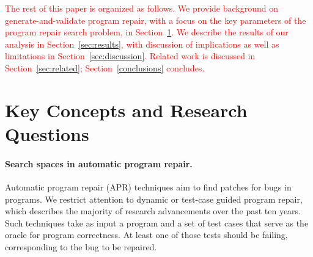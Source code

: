 \documentclass[sigconf, timestamp-false, anonymous=true]{acmart}
\newcommand\todo[1]{\textcolor{red}{#1}}
\begin{document}
\todo{The rest of this paper is organized as follows.  We provide background on
generate-and-validate program repair, with a focus on the key parameters of the
program repair search problem, in Section~\ref{sec:background}.  We describe the
results of our analysis in Section~\ref{sec:results}, with discussion of
implications as well as limitations in Section~\ref{sec:discussion}.  Related
work is discussed in Section~\ref{sec:related}; Section~\ref{conclusions}
concludes.}

\section{Key Concepts and Research Questions}
\label{sec:background}

\paragraph{Search spaces in automatic program repair.} Automatic program repair (APR) techniques aim to find patches for bugs in
programs.  We restrict attention to dynamic or test-case guided program repair,
which describes the majority of research advancements over the past ten years.
Such techniques take as input a program and a set of test cases that serve as
the oracle for program correctness.  At least one of those tests should be
failing, corresponding to the bug to be repaired.
\end{document}
